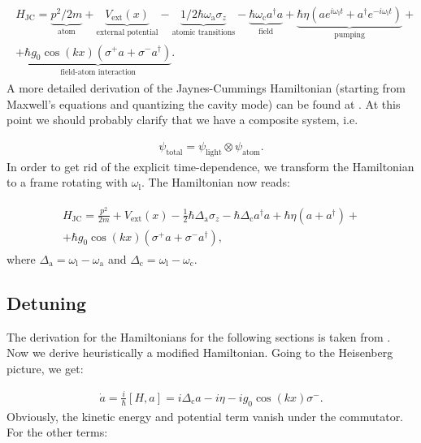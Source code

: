 \begin{align}
\begin{split}
H_\text{JC} = \underbrace{p^2 / 2m}_\text{atom} + \underbrace{V_\text{ext}(x)}_\text{external potential} - \underbrace{1/2 \hbar \omega_\text{a} \sigma_z}_\text{atomic transitions} - \underbrace{\hbar \omega_\text{c} a^\dagger a}_\text{field} + \underbrace{\hbar \eta (a e^{i \omega_\text{l} t} + a^\dagger e^{-i \omega_\text{l} t})}_\text{pumping} + \\
+ \underbrace{\hbar g_0 \cos(kx) (\sigma^+ a + \sigma^- a^\dagger)}_\text{field-atom interaction}.
\end{split}
\end{align}A more detailed derivation of the Jaynes-Cummings Hamiltonian (starting from Maxwell's equations and quantizing the cavity mode) can be found at \cite{collapseandrevival}. At this point we should probably clarify that we have a composite system, i.e.

\begin{align}
\psi_\text{total} = \psi_\text{light} \otimes \psi_\text{atom}.
\end{align}In order to get rid of the explicit time-dependence, we transform the Hamiltonian to a frame rotating with $\omega_\text{l}$. The Hamiltonian now reads:

\begin{align}
\begin{split}
H_\text{JC} = \frac{p^2}{2m} + V_\text{ext}(x) - \frac{1}{2} \hbar \Delta_\text{a} \sigma_z - \hbar \Delta_\text{c} a^\dagger a + \hbar \eta (a + a^\dagger) + \\
+ \hbar g_0 \cos(kx) (\sigma^+ a + \sigma^- a^\dagger),
\end{split}
\end{align}where $\Delta_\text{a} = \omega_\text{l} - \omega_\text{a}$ and $\Delta_\text{c} = \omega_\text{l} - \omega_\text{c}$.

\subsection{Detuning}
The derivation for the Hamiltonians for the following sections is taken from \cite{donner}. Now we derive heuristically a modified Hamiltonian. Going to the Heisenberg picture, we get:

\begin{align}
\dot{a} = \frac{i}{\hbar} [H, a] = i \Delta_\text{c} a - i \eta -i g_0 \cos(kx) \sigma^-.
\label{a_dot}
\end{align}Obviously, the kinetic energy and potential term vanish under the commutator. For the other terms:

